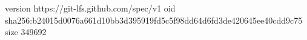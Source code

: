 version https://git-lfs.github.com/spec/v1
oid sha256:b24015d0076a661d10bb3d395919fd5c5f98dd64d6fd3de420645ee40cdd9c75
size 349692
